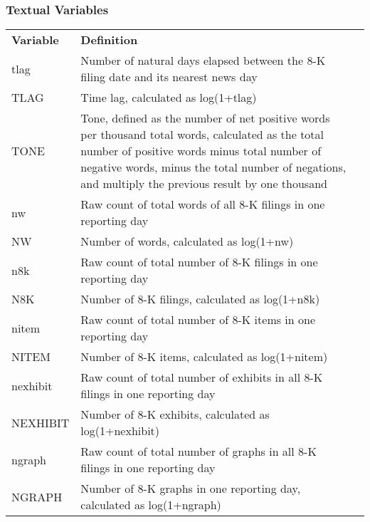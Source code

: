 \subsubsection*{Textual Variables}
\begin{table}[H]
	\centering
	\begin{tabular}{lp{15cm}p{15cm}}
		\midrule
		\midrule
		\textbf{Variable} & \textbf{Definition} \\
		tlag & Number of natural days elapsed between the 8-K filing date and its nearest news day\\
		TLAG & Time lag, calculated as log(1+tlag)\\
		TONE & Tone, defined as the number of net positive words per thousand total words, calculated as the total number of positive words minus total number of negative words, minus the total number of negations, and multiply the previous result by one thousand\\
		nw & Raw count of total words of all 8-K filings in one reporting day \\
		NW & Number of words, calculated as log(1+nw)\\
		n8k & Raw count of total number of 8-K filings in one reporting day \\
		N8K & Number of 8-K filings, calculated as log(1+n8k) \\
		nitem & Raw count of total number of 8-K items in one reporting day \\
		NITEM & Number of 8-K items, calculated as log(1+nitem) \\
		nexhibit & Raw count of total number of exhibits in all 8-K filings in one reporting day \\
		NEXHIBIT & Number of 8-K exhibits, calculated as log(1+nexhibit) \\
		ngraph & Raw count of total number of graphs in all 8-K filings in one reporting day \\
		NGRAPH & Number of 8-K graphs in one reporting day, calculated as log(1+ngraph) \\
		\bottomrule
		\bottomrule
	\end{tabular}%
\end{table}%

